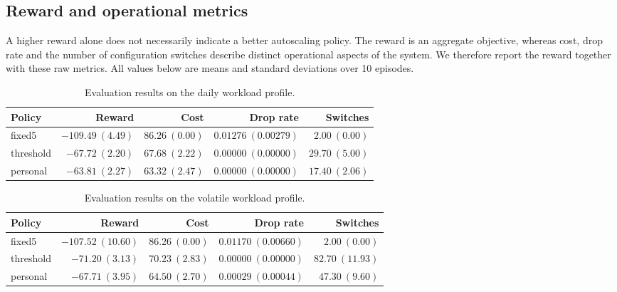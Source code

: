 \documentclass[a4paper,11pt]{article}
\begin{document}
\subsection{Reward and operational metrics}

A higher reward alone does not necessarily indicate a better autoscaling
policy. The reward is an aggregate objective, whereas cost, drop rate and
the number of configuration switches describe distinct operational aspects
of the system. We therefore report the reward together with these raw
metrics. All values below are means and standard deviations over 10 episodes.

\begin{table}[H]
    \centering
    \small
    \begin{tabular}{lrrrr}
        \toprule
        \textbf{Policy} &
        \textbf{Reward} &
        \textbf{Cost} &
        \textbf{Drop rate} &
        \textbf{Switches} \\
        \midrule
        fixed5 &
        $-109.49 \ (4.49)$ &
        $86.26 \ (0.00)$ &
        $0.01276 \ (0.00279)$ &
        $2.00 \ (0.00)$ \\
        threshold &
        $-67.72 \ (2.20)$ &
        $67.68 \ (2.22)$ &
        $0.00000 \ (0.00000)$ &
        $29.70 \ (5.00)$ \\
        personal &
        $\mathbf{-63.81} \ (2.27)$ &
        $\mathbf{63.32} \ (2.47)$ &
        $0.00000 \ (0.00000)$ &
        $\mathbf{17.40} \ (2.06)$ \\
        \bottomrule
    \end{tabular}
    \caption{Evaluation results on the daily workload profile.}
    \label{tab:daily_baselines}
\end{table}

\begin{table}[H]
    \centering
    \small
    \begin{tabular}{lrrrr}
        \toprule
        \textbf{Policy} &
        \textbf{Reward} &
        \textbf{Cost} &
        \textbf{Drop rate} &
        \textbf{Switches} \\
        \midrule
        fixed5 &
        $-107.52 \ (10.60)$ &
        $86.26 \ (0.00)$ &
        $0.01170 \ (0.00660)$ &
        $2.00 \ (0.00)$ \\
        threshold &
        $-71.20 \ (3.13)$ &
        $70.23 \ (2.83)$ &
        $0.00000 \ (0.00000)$ &
        $82.70 \ (11.93)$ \\
        personal &
        $\mathbf{-67.71} \ (3.95)$ &
        $\mathbf{64.50} \ (2.70)$ &
        $0.00029 \ (0.00044)$ &
        $\mathbf{47.30} \ (9.60)$ \\
        \bottomrule
    \end{tabular}
    \caption{Evaluation results on the volatile workload profile.}
    \label{tab:volatile_baselines}
\end{table}
\end{document}
